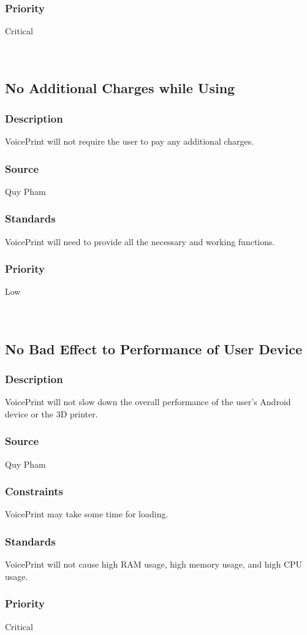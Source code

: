 \subsubsection{Priority}
Critical\\
\\
\\

\subsection{No Additional Charges while Using}
\subsubsection{Description}
VoicePrint will not require the user to pay any additional charges.
\subsubsection{Source}
Quy Pham
\subsubsection{Standards}
VoicePrint will need to provide all the necessary and working functions.
\subsubsection{Priority}
Low\\
\\
\\

\subsection{No Bad Effect to Performance of User Device}
\subsubsection{Description}
VoicePrint will not slow down the overall performance of the user's Android device or the 3D printer.
\subsubsection{Source}
Quy Pham
\subsubsection{Constraints}
VoicePrint may take some time for loading.
\subsubsection{Standards}
VoicePrint will not cause high RAM usage, high memory usage, and high CPU usage.
\subsubsection{Priority}
Critical